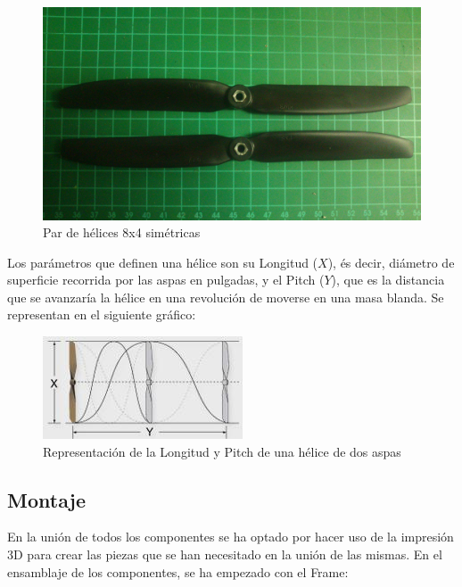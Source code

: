 \documentclass[twoside,11pt]{report}
\begin{document}
\begin{figure}[h!]
\begin{center}
\includegraphics[scale=0.065,viewport=0 200 2560 1100,clip]{images/propeller_image.jpg}
\caption{Par de hélices 8x4 simétricas}
\end{center}
\end{figure}

Los parámetros que definen una hélice son su Longitud ($X$), és decir, diámetro de superficie recorrida por las aspas en pulgadas, y el Pitch ($Y$), que es la distancia que se avanzaría la hélice en una revolución de moverse en una masa blanda. Se representan en el siguiente gráfico:

\begin{figure}[h!]
\begin{center}
\includegraphics[scale=0.9]{images/propeller_xy.jpeg}
\caption{Representación de la Longitud y Pitch de una hélice de dos aspas}
\end{center}
\end{figure} 

\newpage
\subsection{Montaje}

En la unión de todos los componentes se ha optado por hacer uso de la impresión 3D para crear las piezas que se han necesitado en la unión de las mismas. En el ensamblaje de los componentes, se ha empezado con el Frame: \\
\end{document}
